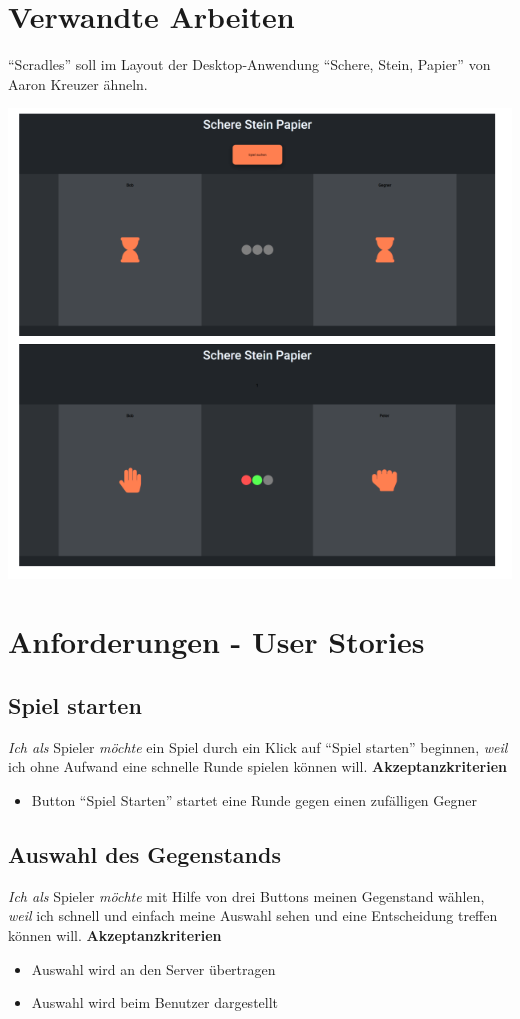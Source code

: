 \documentclass[conference]{IEEEtran}
\begin{document}
\section{Verwandte Arbeiten}
"`Scradles"' soll im Layout der Desktop-Anwendung "`Schere, Stein, Papier"' von Aaron Kreuzer ähneln.
\begin{center}
    \includegraphics[width=\linewidth]{verwandt.png}
\end{center}

\section{Anforderungen - User Stories}
\subsection{Spiel starten}
\textit{Ich als} Spieler
\textit{möchte} ein Spiel durch ein Klick auf "`Spiel starten"' beginnen,
\textit{weil} ich ohne Aufwand eine schnelle Runde spielen können will.
\newline
\textbf{Akzeptanzkriterien}
\begin{itemize}
    \item Button "`Spiel Starten"' startet eine Runde gegen einen zufälligen Gegner
\end{itemize}

\subsection{Auswahl des Gegenstands}
\textit{Ich als} Spieler
\textit{möchte} mit Hilfe von drei Buttons meinen Gegenstand wählen,
\textit{weil} ich schnell und einfach meine Auswahl sehen und eine Entscheidung treffen können will.
\textbf{Akzeptanzkriterien}
\begin{itemize}
    \item Auswahl wird an den Server übertragen
    \item Auswahl wird beim Benutzer dargestellt
\end{itemize}
\end{document}
